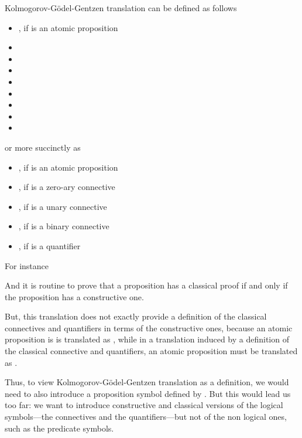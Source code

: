 \documentclass{article}
\begin{document}
Kolmogorov-G\"odel-Gentzen translation can be defined as follows
\begin{itemize}
\item , if  is an atomic proposition
\item  
\item  
\item 
\item 
\item 
\item 
\item 
\item 
\end{itemize}
or more succinctly as 
\begin{itemize}
\item , if  is an atomic proposition
\item , if  is a zero-ary connective
\item , if  is a unary connective
\item , if  is a binary connective
\item , if  is a quantifier
\end{itemize}
For instance 

And it is routine to prove that 
a proposition  has a classical proof if and only if the
proposition  has a constructive one.  

But, this translation does not exactly provide a definition of the
classical connectives and quantifiers in terms of the constructive
ones, because an atomic proposition is  is translated as , while in a translation induced by a definition of the classical
connective and quantifiers, an atomic proposition  must be
translated as .

Thus, to view Kolmogorov-G\"odel-Gentzen translation as a definition,
we would need to also introduce a proposition symbol  defined by
. But this would lead us too far: we want to
introduce constructive and classical versions of the logical
symbols---the connectives and the quantifiers---but not of the non
logical ones, such as the predicate symbols.
\end{document}
